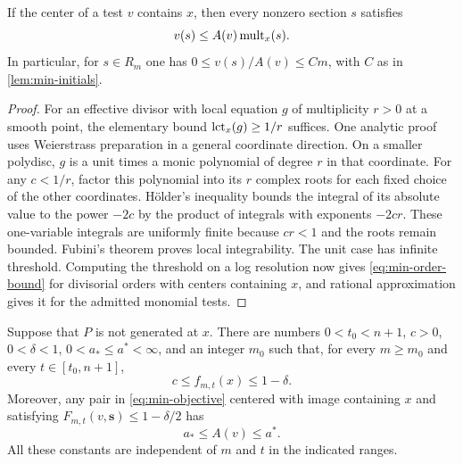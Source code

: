 \begin{lemma}
\label{lem:min-order-bound}
If the center of a test $v$ contains $x$, then every nonzero section $s$ satisfies
\begin{equation}
\label{eq:min-order-bound}
 v(s)\leq{A}(v)\operatorname{mult}_x(s).
\end{equation}
In particular, for $s\in R_m$ one has $0\leq v(s)/{A}(v)\leq Cm$, with $C$ as in \cref{lem:min-initials}.
\end{lemma}

\begin{proof}
For an effective divisor with local equation $g$ of multiplicity $r>0$ at a smooth point, the elementary bound $\operatorname{lct}_x(g)\geq1/r$ suffices. One analytic proof uses Weierstrass preparation in a general coordinate direction. On a smaller polydisc, $g$ is a unit times a monic polynomial of degree $r$ in that coordinate. For any $c<1/r$, factor this polynomial into its $r$ complex roots for each fixed choice of the other coordinates. H\"older's inequality bounds the integral of its absolute value to the power $-2c$ by the product of integrals with exponents $-2cr$. These one-variable integrals are uniformly finite because $cr<1$ and the roots remain bounded. Fubini's theorem proves local integrability. The unit case has infinite threshold. Computing the threshold on a log resolution now gives \eqref{eq:min-order-bound} for divisorial orders with centers containing $x$, and rational approximation gives it for the admitted monomial tests.
\end{proof}

\begin{lemma}
\label{lem:min-coercivity}
Suppose that $P$ is not generated at $x$. There are numbers $0<t_0<n+1$, $c>0$, $0<\delta<1$, $0<a_*\leq a^*<\infty$, and an integer $m_0$ such that, for every $m\geq m_0$ and every $t\in[t_0,n+1]$,
\begin{equation}
\label{eq:min-uniform-bounds}
 c\leq f_{m,t}(x)\leq1-\delta.
\end{equation}
Moreover, any pair in \eqref{eq:min-objective} centered with image containing $x$ and satisfying $F_{m,t}(v,\mathbf{s})\leq1-\delta/2$ has
\begin{equation}
\label{eq:min-discrepancy-bounds}
 a_*\leq{A}(v)\leq a^*.
\end{equation}
All these constants are independent of $m$ and $t$ in the indicated ranges.
\end{lemma}

